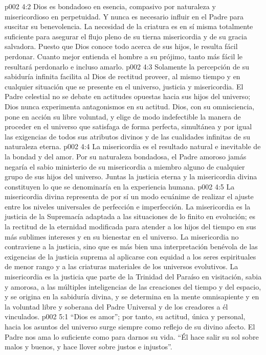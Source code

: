 \vs p002 4:2 Dios es bondadoso en esencia, compasivo por naturaleza y misericordioso en perpetuidad. Y nunca es necesario influir en el Padre para suscitar su benevolencia. La necesidad de la criatura es en sí misma totalmente suficiente para asegurar el flujo pleno de su tierna misericordia y de su gracia salvadora. Puesto que Dios conoce todo acerca de sus hijos, le resulta fácil perdonar. Cuanto mejor entienda el hombre a su prójimo, tanto más fácil le resultará perdonarlo e incluso amarlo.
\vs p002 4:3 \pc Solamente la percepción de su sabiduría infinita facilita al Dios de rectitud proveer, al mismo tiempo y en cualquier situación que se presente en el universo, justicia y misericordia. El Padre celestial no se debate en actitudes opuestas hacia sus hijos del universo; Dios nunca experimenta antagonismos en su actitud. Dios, con su omnisciencia, pone en acción su libre voluntad, y elige de modo indefectible la manera de proceder en el universo que satisfaga de forma perfecta, simultánea y por igual las exigencias de todos sus atributos divinos y de las cualidades infinitas de su naturaleza eterna.
\vs p002 4:4 La misericordia es el resultado natural e inevitable de la bondad y del amor. Por su naturaleza bondadosa, el Padre amoroso jamás negaría el sabio ministerio de su misericordia a miembro alguno de cualquier grupo de sus hijos del universo. Juntas la justicia eterna y la misericordia divina constituyen lo que se denominaría  en la experiencia humana.
\vs p002 4:5 La misericordia divina representa de por sí un modo ecuánime de realizar el ajuste entre los niveles universales de perfección e imperfección. La misericordia es la justicia de la Supremacía adaptada a las situaciones de lo finito en evolución; es la rectitud de la eternidad modificada para atender a los hijos del tiempo en sus más sublimes intereses y en su bienestar en el universo. La misericordia no contraviene a la justicia, sino que es más bien una interpretación benévola de las exigencias de la justicia suprema al aplicarse con equidad a los seres espirituales de menor rango y a las criaturas materiales de los universos evolutivos. La misericordia es la justicia que parte de la Trinidad del Paraíso en visitación, sabia y amorosa, a las múltiples inteligencias de las creaciones del tiempo y del espacio, y se origina en la sabiduría divina, y se determina en la mente omnisapiente y en la voluntad libre y soberana del Padre Universal y de los creadores a él vinculados.
\vs p002 5:1 “Dios es amor”; por tanto, su actitud, única y personal, hacia los asuntos del universo surge siempre como reflejo de su divino afecto. El Padre nos ama lo suficiente como para darnos su vida. “Él hace salir su sol sobre malos y buenos, y hace llover sobre justos e injustos”.
